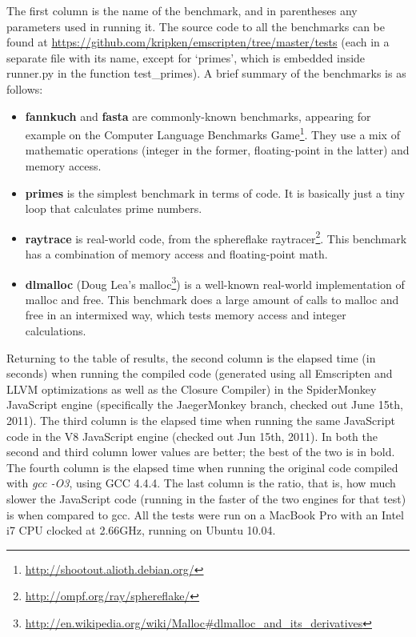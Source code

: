 \documentclass[preprint,10pt]{sigplanconf}
\begin{document}
\bigskip

The first column is the name of the benchmark, and in parentheses any
parameters used in running it. The source code to all the benchmarks
can be found at \url{https://github.com/kripken/emscripten/tree/master/tests}
(each in a separate file with its name, except for `primes', which is
embedded inside runner.py in the function test\_primes). A brief summary of
the benchmarks is as follows:
\begin{itemize}
\item \textbf{fannkuch} and \textbf{fasta} are commonly-known benchmarks, appearing for example
      on the Computer Language Benchmarks Game\footnote{\url{http://shootout.alioth.debian.org/}}.
      They use a mix of mathematic operations (integer in the former, floating-point in the latter) and memory access.
\item \textbf{primes} is the simplest benchmark in terms of code. It is basically just a tiny loop that calculates prime numbers.
\item \textbf{raytrace} is real-world code, from the sphereflake raytracer\footnote{\url{http://ompf.org/ray/sphereflake/}}. This benchmark has a combination of memory access and floating-point math.
\item \textbf{dlmalloc} (Doug Lea's malloc\footnote{\url{http://en.wikipedia.org/wiki/Malloc#dlmalloc_and_its_derivatives}}) is a well-known real-world implementation of malloc and free. This benchmark does a large amount of calls to malloc and free in an intermixed way, which tests memory access and integer calculations. 
\end{itemize}

Returning to the table of results, the second
column is the elapsed time (in seconds) when running the compiled code (generated using all Emscripten and LLVM
optimizations as well as the Closure Compiler) in the SpiderMonkey JavaScript
engine (specifically the JaegerMonkey branch, checked out June 15th, 2011).
The third column is the elapsed time when running the same JavaScript code in the V8 JavaScript engine
(checked out Jun 15th, 2011). In both the second and third column lower values
are better; the best of the two is in bold.
The fourth column is the elapsed time when running the original code compiled with \emph{gcc -O3},
using GCC 4.4.4. The last column is the ratio, that is, how much slower the JavaScript code
(running in the faster of the two engines for that test) is
when compared to gcc. All the tests were run on a MacBook Pro with
an Intel i7 CPU clocked at 2.66GHz, running on Ubuntu 10.04.
\end{document}

